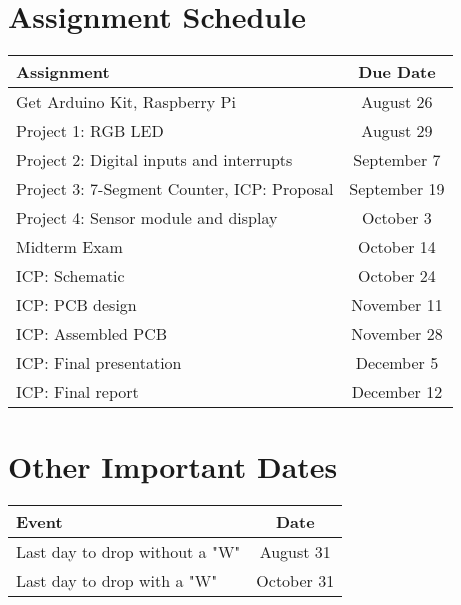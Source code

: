 \pagebreak

\section*{Assignment Schedule} 

\begin{table*}[h!]
    \begin{tabular}{ l | c }
        \toprule
        Assignment & Due Date \\

        \midrule
        Get Arduino Kit, Raspberry Pi\footnotemark                  & August 26     \\
        Project 1: RGB LED                                          & August 29     \\
        Project 2: Digital inputs and interrupts                    & September 7   \\
        Project 3: 7-Segment Counter, ICP: Proposal\footnotemark[2] & September 19  \\
        Project 4: Sensor module and display                        & October 3     \\
        Midterm Exam                                                & October 14    \\
        ICP: Schematic                                              & October 24    \\
        ICP: PCB design                                             & November 11   \\
        ICP: Assembled PCB                                          & November 28   \\
        ICP: Final presentation                                     & December 5    \\
        ICP: Final report                                           & December 12   \\

        \bottomrule
    \end{tabular}
\end{table*}

\section*{Other Important Dates}

\begin{table*}[h!]
    \begin{tabular}{ l | c }
        \toprule
        Event & Date \\

        \midrule
        Last day to drop without a "W"  & August 31 \\
        Last day to drop with a "W"     & October 31 \\

        \bottomrule
    \end{tabular}
\end{table*}

